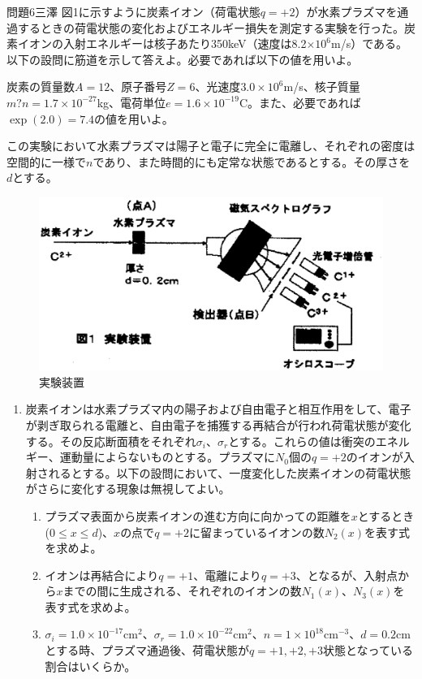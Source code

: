 \documentclass[fleqn]{jbook}
\begin{document}
\begin{question}{問題6}{三澤}
図1に示すように炭素イオン（荷電状態$q=+2$）が水素プラズマを通過するときの荷電状態の変化およびエネルギー損失を測定する実験を行った。炭素イオンの入射エネルギーは核子あたり350keV（速度は8.2$\times10^6$m/s）である。以下の設問に筋道を示して答えよ。必要であれば以下の値を用いよ。

炭素の質量数$A=12$、原子番号$Z=6$、光速度$3.0\times10^6$m/s、核子質量$m?n=1.7\times10^{-27}$kg、電荷単位$e=1.6\times10^{-19}$C。また、必要であれば$\exp(2.0)=7.4$の値を用いよ。

この実験において水素プラズマは陽子と電子に完全に電離し、それぞれの密度は空間的に一様で$n$であり、また時間的にも定常な状態であるとする。その厚さを$d$とする。
\begin{figure}[htbp]
\begin{center}
\includegraphics[width=.9\linewidth]{2002phy6q.eps}
\caption{実験装置}
\end{center}
\end{figure}
\begin{enumerate}
\item 炭素イオンは水素プラズマ内の陽子および自由電子と相互作用をして、電子が剥ぎ取られる電離と、自由電子を捕獲する再結合が行われ荷電状態が変化する。その反応断面積をそれぞれ$\sigma_i$、$\sigma_r$とする。これらの値は衝突のエネルギー、運動量によらないものとする。プラズマに$N_0$個の$q=+2$のイオンが入射されるとする。以下の設問において、一度変化した炭素イオンの荷電状態がさらに変化する現象は無視してよい。
\begin{enumerate}
\item プラズマ表面から炭素イオンの進む方向に向かっての距離を$x$とするとき($0\leq x\leq d$)、$x$の点で$q=+2$に留まっているイオンの数$N_2(x)$を表す式を求めよ。
\item イオンは再結合により$q=+1$、電離により$q=+3$、となるが、入射点から$x$までの間に生成される、それぞれのイオンの数$N_1(x)$、$N_3(x)$を表す式を求めよ。
\item $\sigma_i=1.0\times10^{-17}$cm$^2$、$\sigma_r=1.0\times10^{-22}$cm$^2$、$n=1\times10^{18}$cm$^{-3}$、$d=0.2$cmとする時、プラズマ通過後、荷電状態が$q=+1,+2,+3$状態となっている割合はいくらか。

\end{enumerate}
\end{enumerate}
\end{question}
\end{document}
